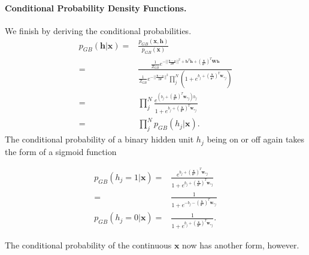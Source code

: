 \documentclass[%
oneside,                 %
final,                   %
10pt]{article}
\begin{document}
\paragraph{Conditional Probability Density Functions.}
We finish by deriving the conditional probabilities.
\begin{align}
	p_{GB} (\bm{h}| \bm{x}) =& \frac{p_{GB} (\bm{x}, \bm{h})}{p_{GB} (\bm{x})} \nonumber \\
	=& \frac{\frac{1}{Z_{GB}} e^{-\vert\vert\frac{\bm{x} -\bm{a}}{2\bm{\sigma}}\vert\vert^2 + \bm{b}^T \bm{h} 
	+ (\frac{\bm{x}}{\bm{\sigma}^2})^T \bm{W}\bm{h}}}
	{\frac{1}{Z_{GB}} e^{-\vert\vert\frac{\bm{x} -\bm{a}}{2\bm{\sigma}}\vert\vert^2}
	\prod_j^N (1 + e^{b_j + (\frac{\bm{x}}{\bm{\sigma}^2})^T \bm{w}_{\ast j}} ) }
	\nonumber \\
	=& \prod_j^N \frac{e^{(b_j + (\frac{\bm{x}}{\bm{\sigma}^2})^T \bm{w}_{\ast j})h_j } }
	{1 + e^{b_j + (\frac{\bm{x}}{\bm{\sigma}^2})^T \bm{w}_{\ast j}}} \nonumber \\
	=& \prod_j^N p_{GB} (h_j|\bm{x}).
\end{align}
The conditional probability of a binary hidden unit $h_j$ being on or off again takes the form of a sigmoid function

\begin{align}
	p_{GB} (h_j =1 | \bm{x}) =& \frac{e^{b_j + (\frac{\bm{x}}{\bm{\sigma}^2})^T \bm{w}_{\ast j} } }
	{1 + e^{b_j + (\frac{\bm{x}}{\bm{\sigma}^2})^T \bm{w}_{\ast j}}} \nonumber \\
	=& \frac{1}{1 + e^{-b_j - (\frac{\bm{x}}{\bm{\sigma}^2})^T \bm{w}_{\ast j}}} \\
	p_{GB} (h_j =0 | \bm{x}) =&
	\frac{1}{1 + e^{b_j +(\frac{\bm{x}}{\bm{\sigma}^2})^T \bm{w}_{\ast j}}} .
\end{align}

The conditional probability of the continuous $\bm{x}$ now has another form, however.
\end{document}
